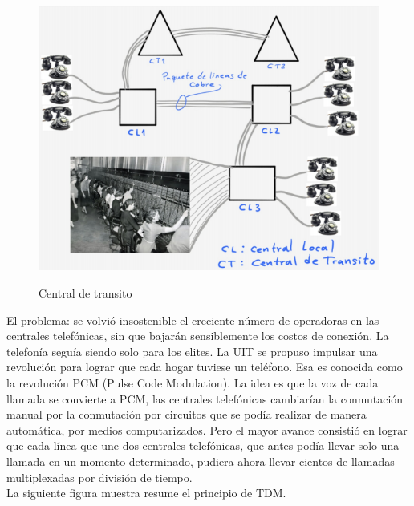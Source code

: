 \vspace{200px}
\begin{figure}[h!]
	\captionsetup{justification = raggedright, singlelinecheck = false}
	\caption{Central de transito} 
	\centering
	\includegraphics[scale=0.8]{Imagenes/Central-transito.png}
	\label{fig:Central-transito}
\end{figure}

El problema: se volvió insostenible el creciente número de operadoras en las centrales telefónicas, sin que bajarán sensiblemente los costos de conexión. La telefonía seguía siendo solo para los elites. La UIT se propuso impulsar una revolución para lograr que cada hogar tuviese un teléfono. Esa es conocida como la revolución PCM (Pulse Code Modulation). La idea es que la voz de cada llamada se convierte a PCM, las centrales telefónicas cambiarían la conmutación manual por la conmutación por circuitos que se podía realizar de manera automática, por medios computarizados. Pero el mayor avance consistió en lograr que cada línea que une dos centrales telefónicas, que antes podía llevar solo una llamada en un momento determinado, pudiera ahora llevar cientos de llamadas multiplexadas por división de tiempo. \\

La siguiente figura muestra resume el principio de TDM.

